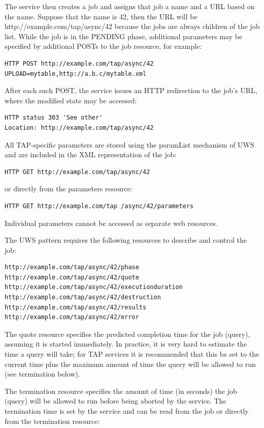 \documentclass[11pt,letter]{ivoa}
\begin{document}
{The service then creates a job and assigns that job a name and a URL based on 
the name. Suppose that the name is 42, then the URL will be 
http://example.com/tap/async/42 because the jobs are always children of the job 
list. While the job is in the PENDING phase, additional parameters may be 
specified by additional POSTs to the job resource, for example:

\begin{verbatim}
HTTP POST http://example.com/tap/async/42
UPLOAD=mytable,http://a.b.c/mytable.xml
\end{verbatim}

After each such POST, the service issues an HTTP redirection to the job's URL, 
where the modified state may be accessed:

\begin{verbatim}
HTTP status 303 'See other'
Location: http://example.com/tap/async/42
\end{verbatim}

All TAP-specific parameters are stored using the paramList mechanism of UWS and 
are included in the XML representation of the job:
\begin{verbatim}
HTTP GET http://example.com/tap/async/42
\end{verbatim}
or directly from the parameters resource:
\begin{verbatim}
HTTP GET http://example.com/tap /async/42/parameters
\end{verbatim}
Individual parameters cannot be accessed as separate web resources.

The UWS pattern requires the following resources to describe and control the 
job:
\begin{verbatim}
http://example.com/tap/async/42/phase
http://example.com/tap/async/42/quote
http://example.com/tap/async/42/executionduration
http://example.com/tap/async/42/destruction
http://example.com/tap/async/42/results
http://example.com/tap/async/42/error
\end{verbatim}
The quote resource specifies the predicted completion time for the job (query), 
assuming it is started immediately. In practice, it is very hard to estimate the 
time a query will take; for TAP services it is recommended that this be set to 
the current time plus the maximum amount of time the query will be allowed to 
run (see termination below). 

The termination resource specifies the amount of time (in seconds) the job 
(query) will be allowed to run before being aborted by the service. The 
termination time is set by the service and can be read from the job or directly 
from the termination resource:

}
\end{document}
